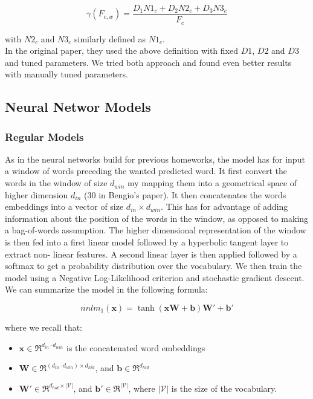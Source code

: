 \documentclass[11pt]{article}
\begin{document}
\[
\gamma(F_{c,w}) = \frac{D_1N1_c + D_2N2_c + D_3N3_c}{F_c}
\]


with $N2_c$ and $N3_c$ similarly defined as $N1_c$.\\

\noindent In the original paper, they used the above definition with fixed $D1$, $D2$ and $D3$ and tuned parameters. We tried both approach and found even better results with manually tuned parameters.

\subsection{Neural Networ Models}

\subsubsection{Regular Models}
As in the neural networks build for previous homeworks, the model has for input a window of words preceding the wanted predicted word. It first convert the words in the window of size $d_{win}$ my mapping them into a geometrical space of higher dimension $d_{in}$ (30 in Bengio's paper). It then concatenates the words embeddings into a vector of size $d_{in}\times d_{win}$. This has for advantage of adding information about the position of the words in the window, as opposed to making a bag-of-words assumption. The higher dimensional representation  of the window is then fed into a first linear model followed by a hyperbolic tangent layer to extract  non- linear features. A second linear layer is then applied followed by a softmax to get a probability distribution over the vocabulary. We then train the model using a Negative Log-Likelihood criterion and stochastic gradient descent.\\

\noindent We can summarize the model in the following formula:

$$ nnlm_1(\boldsymbol{x}) = \tanh(\boldsymbol{xW}+\boldsymbol{b})\boldsymbol{W'}+\boldsymbol{b'}$$

where we recall that:
\begin{itemize}
\item $\boldsymbol{x}\in \Re^{d_{in}\cdot d_{win}}$ is the concatenated word embeddings
\item $\boldsymbol{W}\in \Re^{(d_{in}\cdot d_{win})\times d_{hid}}$, and $\boldsymbol{b}\in \Re^{d_{hid}}$
\item $\boldsymbol{W'}\in \Re^{d_{hid}\times |\mathcal{V}|}$, and $\boldsymbol{b'}\in \Re^{|\mathcal{V}|}$, where $|\mathcal{V}|$ is the size of the vocabulary.
\end{itemize}
\end{document}
